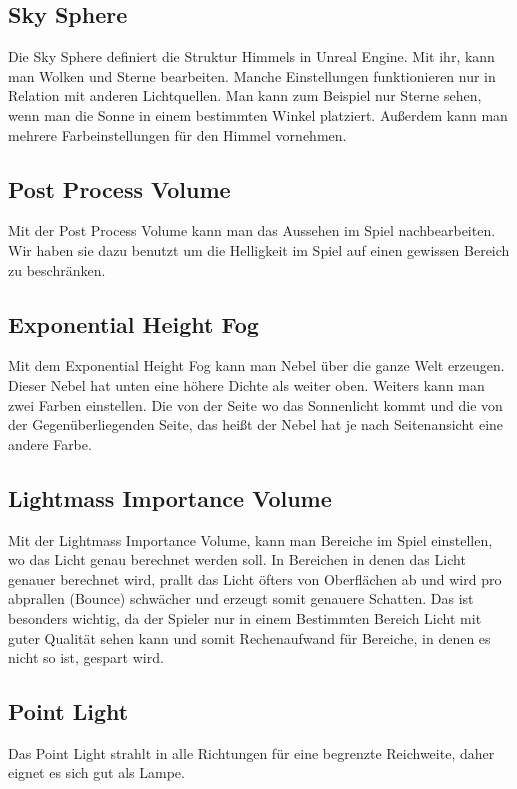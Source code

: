 \subsection{Sky Sphere}
Die Sky Sphere definiert die Struktur Himmels in Unreal Engine.
Mit ihr, kann man Wolken und Sterne bearbeiten. Manche Einstellungen funktionieren nur in Relation mit anderen
Lichtquellen. Man kann zum Beispiel nur Sterne sehen, wenn man die Sonne in einem bestimmten Winkel platziert.
Außerdem kann man mehrere Farbeinstellungen für den Himmel vornehmen.

\subsection{Post Process Volume}
Mit der Post Process Volume kann man das Aussehen im Spiel nachbearbeiten. \citep{unreal:postProcessVolume}
Wir haben sie dazu benutzt um die Helligkeit im Spiel auf einen gewissen Bereich zu beschränken.

\subsection{Exponential Height Fog}
Mit dem Exponential Height Fog kann man Nebel über die ganze Welt erzeugen. Dieser Nebel hat unten eine höhere Dichte als weiter oben. Weiters kann man zwei Farben einstellen.
Die von der Seite wo das Sonnenlicht kommt und die von der Gegenüberliegenden Seite, das heißt der Nebel hat je nach Seitenansicht eine andere Farbe. \citep{unreal:exponentialHeightFog}

\subsection{Lightmass Importance Volume}
Mit der Lightmass Importance Volume, kann man Bereiche im Spiel einstellen, wo das Licht genau berechnet werden soll. In Bereichen in denen das
Licht genauer berechnet wird, prallt das Licht öfters von Oberflächen ab und wird pro abprallen (Bounce) schwächer und erzeugt somit genauere Schatten.
Das ist besonders wichtig, da der Spieler nur in einem Bestimmten Bereich Licht mit guter Qualität sehen kann und somit Rechenaufwand für Bereiche,
in denen es nicht so ist, gespart wird. \citep{unreal:lightmassImportanceVolume}

\subsection{Point Light}
Das Point Light strahlt in alle Richtungen für eine begrenzte Reichweite, daher eignet es sich gut als Lampe.

